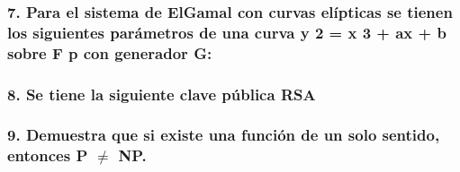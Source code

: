 \documentclass[14pt]{article}
\begin{document}
\subsubsection*{7. Para el sistema de ElGamal con curvas elípticas se tienen los siguientes parámetros de una curva y 2 = x 3 + ax + b sobre F p con generador G:}

\subsubsection*{8. Se tiene la siguiente clave pública RSA}

\subsubsection*{9. Demuestra que si existe una función de un solo sentido, entonces P $\neq$ NP.}
\end{document}
